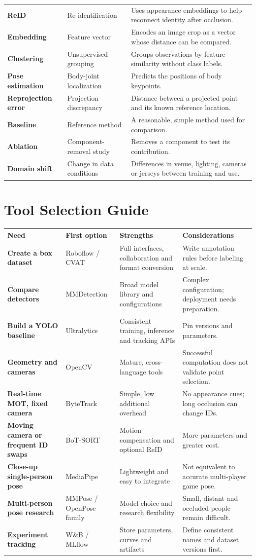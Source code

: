 \documentclass[11pt,a4paper,oneside]{report}
\begin{document}
\begin{longtable}{>{\bfseries\RaggedRight}p{3.6cm} p{4.1cm} p{8cm}}
ReID & Re-identification & Uses appearance embeddings to help reconnect identity after occlusion.\\
Embedding & Feature vector & Encodes an image crop as a vector whose distance can be compared.\\
Clustering & Unsupervised grouping & Groups observations by feature similarity without class labels.\\
Pose estimation & Body-joint localization & Predicts the positions of body keypoints.\\
Reprojection error & Projection discrepancy & Distance between a projected point and its known reference location.\\
Baseline & Reference method & A reasonable, simple method used for comparison.\\
Ablation & Component-removal study & Removes a component to test its contribution.\\
Domain shift & Change in data conditions & Differences in venue, lighting, cameras or jerseys between training and use.\\
\bottomrule
\end{longtable}

\chapter{Tool Selection Guide}

\begin{tabularx}{\textwidth}{>{\bfseries\RaggedRight}p{3cm} Y Y Y}
\toprule
Need & First option & Strengths & Considerations \\
\midrule
Create a box dataset & Roboflow / CVAT & Full interfaces, collaboration and format conversion & Write annotation rules before labeling at scale.\\
Compare detectors & MMDetection & Broad model library and configurations & Complex configuration; deployment needs preparation.\\
Build a YOLO baseline & Ultralytics & Consistent training, inference and tracking APIs & Pin versions and parameters.\\
Geometry and cameras & OpenCV & Mature, cross-language tools & Successful computation does not validate point selection.\\
Real-time MOT, fixed camera & ByteTrack & Simple, low additional overhead & No appearance cues; long occlusion can change IDs.\\
Moving camera or frequent ID swaps & BoT-SORT & Motion compensation and optional ReID & More parameters and greater cost.\\
Close-up single-person pose & MediaPipe & Lightweight and easy to integrate & Not equivalent to accurate multi-player game pose.\\
Multi-person pose research & MMPose / OpenPose family & Model choice and research flexibility & Small, distant and occluded people remain difficult.\\
Experiment tracking & W\&B / MLflow & Store parameters, curves and artifacts & Define consistent names and dataset versions first.\\
\bottomrule
\end{tabularx}
\end{document}
